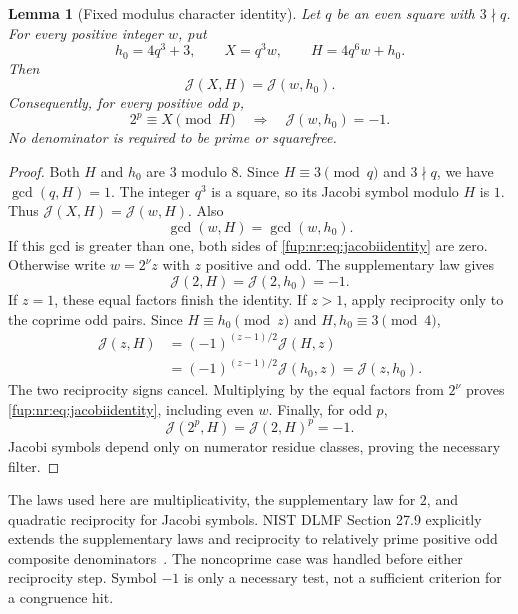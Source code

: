 \documentclass[11pt,letterpaper]{article}
\newtheorem{lemma}[theorem]{Lemma}
\theoremstyle{definition}\newtheorem{definition}[theorem]{Definition}
\theoremstyle{remark}\newtheorem{remark}[theorem]{Remark}
\begin{document}
\begin{lemma}[Fixed modulus character identity]\label{fup:nr:lem:jacobi}
Let $q$ be an even square with $3\nmid q$. For every positive integer $w$, put
\begin{equation}\label{fup:nr:eq:h0}
 h_0=4q^3+3,\qquad X=q^3w,\qquad H=4q^6w+h_0.
\end{equation}
Then
\begin{equation}\label{fup:nr:eq:jacobiidentity}
 \mathcal J(X,H)=\mathcal J(w,h_0).
\end{equation}
Consequently, for every positive odd $p$,
\begin{equation}\label{fup:nr:eq:jacobifilter}
 2^p\equiv X\pmod H\quad\Longrightarrow\quad \mathcal J(w,h_0)=-1.
\end{equation}
No denominator is required to be prime or squarefree.
\end{lemma}
\begin{proof}
Both $H$ and $h_0$ are $3$ modulo $8$. Since $H\equiv3\pmod q$ and $3\nmid q$, we have $\gcd(q,H)=1$. The integer $q^3$ is a square, so its Jacobi symbol modulo $H$ is $1$. Thus $\mathcal J(X,H)=\mathcal J(w,H)$. Also
\[
 \gcd(w,H)=\gcd(w,h_0).
\]
If this gcd is greater than one, both sides of \eqref{fup:nr:eq:jacobiidentity} are zero. Otherwise write $w=2^\nu z$ with $z$ positive and odd. The supplementary law gives
\[
 \mathcal J(2,H)=\mathcal J(2,h_0)=-1.
\]
If $z=1$, these equal factors finish the identity. If $z>1$, apply reciprocity only to the coprime odd pairs. Since $H\equiv h_0\pmod z$ and $H,h_0\equiv3\pmod4$,
\begin{align*}
 \mathcal J(z,H)
 &=(-1)^{(z-1)/2}\mathcal J(H,z)\\
 &=(-1)^{(z-1)/2}\mathcal J(h_0,z)
 =\mathcal J(z,h_0).
\end{align*}
The two reciprocity signs cancel. Multiplying by the equal factors from $2^\nu$ proves \eqref{fup:nr:eq:jacobiidentity}, including even $w$. Finally, for odd $p$,
\[
 \mathcal J(2^p,H)=\mathcal J(2,H)^p=-1.
\]
Jacobi symbols depend only on numerator residue classes, proving the necessary filter.
\end{proof}
The laws used here are multiplicativity, the supplementary law for $2$, and quadratic reciprocity for Jacobi symbols. NIST DLMF Section 27.9 explicitly extends the supplementary laws and reciprocity to relatively prime positive odd composite denominators~\cite{fup:nr:dlmf}. The noncoprime case was handled before either reciprocity step. Symbol $-1$ is only a necessary test, not a sufficient criterion for a congruence hit.
\end{document}
